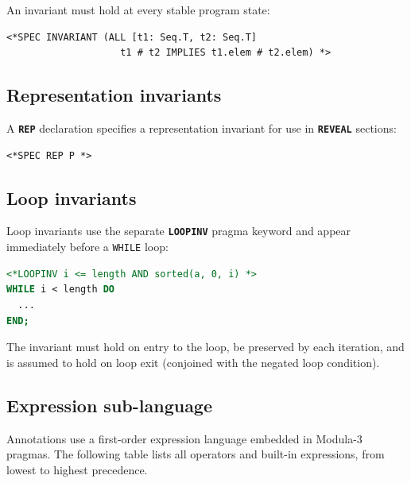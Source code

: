\documentclass[11pt]{article}
\newcommand{\m}[1]{\texttt{#1}}
\newcommand{\kw}[1]{\texttt{\textbf{#1}}}
\begin{document}
An invariant must hold at every stable program state:

\begin{lstlisting}[language=ESC]
<*SPEC INVARIANT (ALL [t1: Seq.T, t2: Seq.T]
                    t1 # t2 IMPLIES t1.elem # t2.elem) *>
\end{lstlisting}

\subsection{Representation invariants}

A \kw{REP} declaration specifies a representation invariant for use in
\kw{REVEAL} sections:

\begin{lstlisting}[language=ESC]
<*SPEC REP P *>
\end{lstlisting}

\subsection{Loop invariants}

Loop invariants use the separate \kw{LOOPINV} pragma keyword and
appear immediately before a \m{WHILE} loop:

\begin{lstlisting}[language=Modula3]
<*LOOPINV i <= length AND sorted(a, 0, i) *>
WHILE i < length DO
  ...
END;
\end{lstlisting}

The invariant must hold on entry to the loop, be preserved by each
iteration, and is assumed to hold on loop exit (conjoined with the
negated loop condition).

\subsection{Expression sub-language}
\label{sec:exprs}

Annotations use a first-order expression language embedded in Modula-3
pragmas.  The following table lists all operators and built-in
expressions, from lowest to highest precedence.
\end{document}
